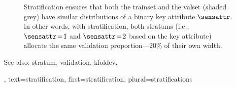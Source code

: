 {{\begin{figure}[H]
 		\caption{Stratification ensures that both the \gls{trainset} and the \gls{valset} 
			(shaded grey) have similar distributions of a binary key attribute $\sensattr$. 
			In other words, with stratification, both \glspl{stratum}  
			(i.e., $\sensattr\!=\!1$ and $\sensattr\!=\!2$ based on the key attribute) 
			allocate the same \gls{validation} proportion—20\% of their own width. \label{fig_stratification_dict}}
 		\end{figure}
  		See also: \gls{stratum}, \gls{validation}, \gls{kfoldcv}.},
  	text={stratification},
  	first={stratification},
  	plural={stratifications}
}

